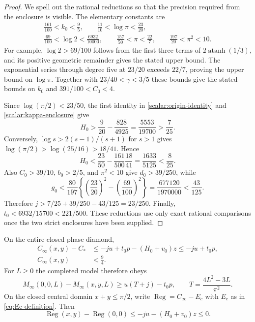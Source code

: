 \begin{proof}
We spell out the rational reductions so that the precision required
from the enclosure is visible.  The elementary constants are
\begin{gather*}
 \frac{161}{100}<k_0<\frac95,\qquad
 \frac{11}{10}<\log\pi<\frac{23}{20},\\
 \frac{69}{100}<\log2<\frac{6932}{10000},\qquad
 \frac{157}{50}<\pi<\frac{22}{7},\qquad
 \frac{197}{20}<\pi^2<10.
\end{gather*}
For example, $\log2>69/100$ follows from the first three terms of
$2\operatorname{atanh}(1/3)$, and its positive geometric remainder
gives the stated upper bound.  The exponential series through degree
five at $23/20$ exceeds $22/7$, proving the upper bound on
$\log\pi$.  Together with $23/40<\gamma<3/5$ these bounds give
the stated bounds on $k_0$ and $391/100<C_0<4$.

Since $\log(\pi/2)<23/50$, the first identity in
\eqref{scalar:origin-identity} and \eqref{scalar:kappa-enclosure} give
\[
 H_0>\frac9{20}-\frac{828}{4925}
       =\frac{5553}{19700}>\frac7{25}.
\]
Conversely, $\log s>2(s-1)/(s+1)$ for $s>1$ gives
$\log(\pi/2)>\log(25/16)>18/41$.  Hence
\[
 H_0<\frac{23}{50}-\frac{161}{500}\frac{18}{41}
       =\frac{1633}{5125}<\frac8{25}.
\]
Also $C_0>39/10$, $b_0>2/5$, and $\pi^2<10$ give
$d_0>39/250$, while
\[
 g_0<\frac{80}{197}
 \left\{\left(\frac{23}{20}\right)^2-
               \left(\frac{69}{100}\right)^2\right\}
 =\frac{677120}{1970000}<\frac{43}{125}.
\]
Therefore $j>7/25+39/250-43/125=23/250$.
Finally,
$t_0<6932/15700<221/500$.  These reductions use only exact rational
comparisons once the two strict enclosures have been supplied.
\end{proof}

\begin{proposition}
\label{scalar:master}
On the entire closed phase diamond,
\begin{align}
 C_\infty(x,y)-C_*
 &\leq-ju+t_0p-(H_0+v_0)z
 \leq-ju+t_0p,                                      \label{scalar:global-master}\\
 C_\infty(x,y)&<\frac94.                             \label{scalar:global-nine-fourths}
\end{align}
For $L\geq0$ the completed model therefore obeys
\begin{equation}\label{scalar:outer-master}
 M_\infty(0,0,L)-M_\infty(x,y,L)
 \geq u(T+j)-t_0p,\qquad T=\frac{4L^2-3L}{\pi^2}.
\end{equation}
On the closed central domain $x+y\leq\pi/2$, write
$\operatorname{Reg}=C_\infty-E_c$ with $E_c$ as in
\eqref{eq:Ec-definition}.  Then
\begin{equation}\label{scalar:regular-loss}
 \operatorname{Reg}(x,y)-\operatorname{Reg}(0,0)
 \leq-ju-(H_0+v_0)z\leq0.
\end{equation}
\end{proposition}

